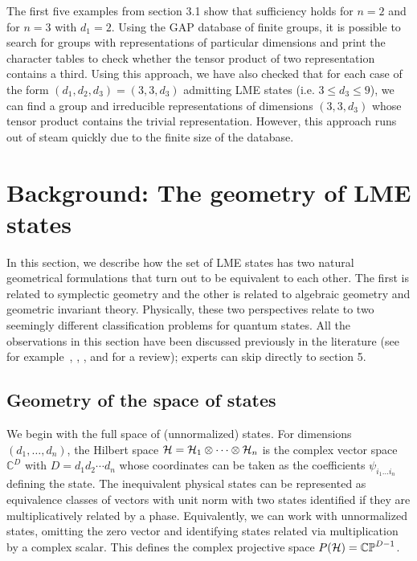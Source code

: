 \documentclass[12pt]{article}
\theoremstyle{definition}
\begin{document}
The first five examples from section 3.1 show that sufficiency holds for $n=2$ and for $n=3$ with $d_1 = 2$. Using the GAP database of finite groups, it is possible to search for groups with representations of particular dimensions and print the character tables to check whether the tensor product of two representation contains a third. Using this approach, we have also checked that for each case of the form $(d_1,d_2,d_3) = (3,3,d_3)$ admitting LME states (i.e. $3 \le d_3 \le 9$), we can find a group and irreducible representations of dimensions $(3,3,d_3)$ whose tensor product contains the trivial representation. However, this approach runs out of steam quickly due to the finite size of the database.


\section{Background: The geometry of LME states}

In this section, we describe how the set of LME states has two natural geometrical formulations that turn out to be equivalent to each other. The first is related to symplectic geometry and the other is related to algebraic geometry and geometric invariant theory. Physically, these two perspectives relate to two seemingly different classification problems for quantum states. All the observations in this section have been discussed previously in the literature (see for example~\cite{Kly02}, \cite[\S~3]{Kly07}, \cite[\S~4]{wallach}, and \cite{Walter} for a review); experts can skip directly to section 5.

\subsection{Geometry of the space of states}

We begin with the full space of (unnormalized) states. For dimensions $(d_1,\dots, d_n)$, the Hilbert space ${\cal H} = {\cal H}_1  \otimes \cdots  \otimes {\cal H}_n$ is the complex vector space  $\mathbb{C}^{D}$ with $D = d_1 d_2 \cdots d_n$ whose coordinates can be taken as the coefficients $\psi_{i_1 \dots i_n}$ defining the state. The inequivalent physical states can be represented as equivalence classes of vectors with unit norm with two states identified if they are multiplicatively related by a phase. Equivalently, we can work with unnormalized states, omitting the zero vector and identifying states related via multiplication by a complex scalar. This defines the complex projective space $P({\cal H}) = \mathbb{C P}^{D-1}$.
\end{document}
